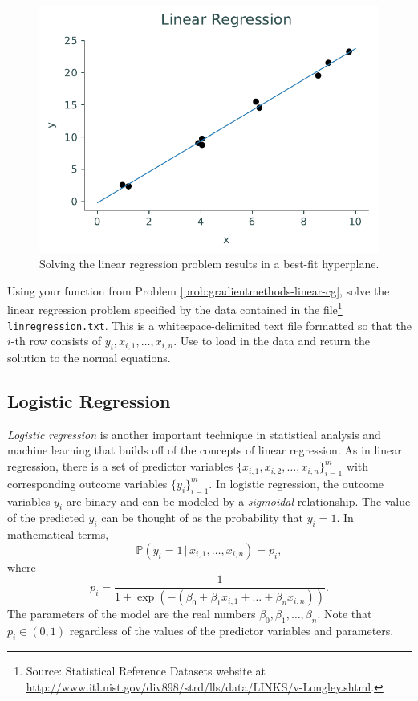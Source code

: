 \begin{figure}[H]
\centering
\includegraphics[width=.7\textwidth]{figures/linregression.pdf}
\caption{Solving the linear regression problem results in a best-fit hyperplane.}
\label{fig:linregression}
\end{figure}

\begin{problem}{}{}
Using your function from Problem \ref{prob:gradientmethods-linear-cg}, solve the linear regression problem specified by the data contained in the file\footnote{Source: Statistical Reference Datasets website at \url{http://www.itl.nist.gov/div898/strd/lls/data/LINKS/v-Longley.shtml}.}
\texttt{linregression.txt}.
This is a whitespace-delimited text file formatted so that the $i$-th row consists of $y_i, x_{i,1}, \ldots, x_{i,n}$.
Use  to load in the data and return the solution to the normal equations.
\end{problem}

\subsection*{Logistic Regression} %

\emph{Logistic regression} is another important technique in statistical analysis and machine learning that builds off of the concepts of linear regression.
As in linear regression, there is a set of predictor variables $\{x_{i, 1}, x_{i, 2}, \dots, x_{i, n}\}_{i = 1}^{m}$ with corresponding outcome variables $\{y_i\}_{i = 1}^{m}$.
In logistic regression, the outcome variables $y_i$ are binary and can be modeled by a \emph{sigmoidal} relationship.
The value of the predicted $y_i$ can be thought of as the probability that $y_i = 1$.
In mathematical terms,
\[
\mathbb{P}(y_i = 1 \, | \, x_{i,1}, \dots, x_{i,n}) = p_i,
\]
where
\[
p_i = \frac{1}{1+\exp(-(\beta_0 + \beta_1x_{i,1} + \dots + \beta_nx_{i,n}))}.
\]
The parameters of the model are the real numbers $\beta_0, \beta_1,\dots, \beta_n$.
Note that $p_i \in (0, 1)$ regardless of the values of the predictor variables and parameters.

